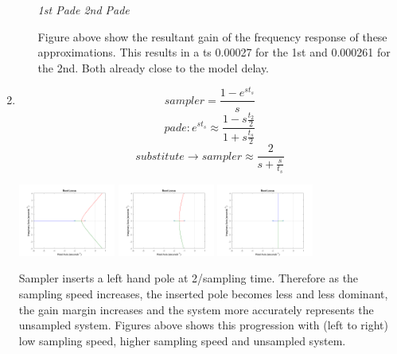 \documentclass[11pt]{article}
\begin{document}
\begin{preview}
\begin{enumerate}
\begin{enumerate}
\begin{center}
                \textit{1st Pade \hspace*{0.2\textwidth} 2nd Pade}
            \end{center}
            Figure above show the resultant gain of the frequency response of these approximations. This results in a ts 0.00027 for the 1st and 0.000261 for the 2nd. Both already close to the model delay.
    \end{enumerate}
    \item
    $$sampler = \frac{1-e^{st_s}}{s}$$
    $$pade: e^{st_s} \approx \frac{1-s\frac{t_2}{2}}{1+s\frac{t_s}{2}}$$
    $$substitute \rightarrow sampler \approx \frac{2}{s + \frac{s}{t_s}}$$
    \begin{center}
        \includegraphics[width=0.25\textwidth]{fig/b2_ts_1_rloc.png}
        \includegraphics[width=0.25\textwidth]{fig/b2_ts_0.1_rloc.png}
        \includegraphics[width=0.25\textwidth]{fig/b2_cont_rloc.png}
    \end{center}
    Sampler inserts a left hand pole at 2/sampling time. Therefore as the sampling speed increases, the inserted pole becomes less and less dominant, the gain margin increases and the system more accurately represents the unsampled system. Figures above shows this progression with  (left to right) low sampling speed, higher sampling speed and unsampled system.


\end{enumerate}
\end{preview}
\end{document}
